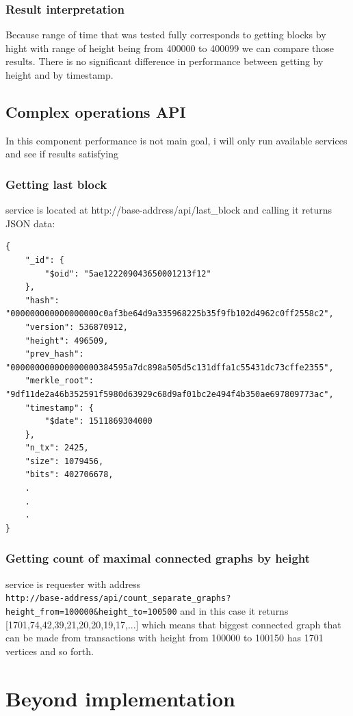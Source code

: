 \documentclass[12pt, en, eng, oneside]{mgr}
\begin{document}
\subsection{Result interpretation}
Because range of time that was tested fully corresponds to getting blocks by hight with range of height being from 400000 to 400099 we can compare those results. There is no significant difference in performance between getting by height and by timestamp.

\section{Complex operations API}
In this component performance is not main goal, i will only run available services and see if results satisfying

\subsection{Getting last block}
service is located at http://base-address/api/last\_block and calling it returns JSON data:
\begin{verbatim}
{
    "_id": {
        "$oid": "5ae122209043650001213f12"
    },
    "hash": "000000000000000000c0af3be64d9a335968225b35f9fb102d4962c0ff2558c2",
    "version": 536870912,
    "height": 496509,
    "prev_hash": "000000000000000000384595a7dc898a505d5c131dffa1c55431dc73cffe2355",
    "merkle_root": "9df11de2a46b352591f5980d63929c68d9af01bc2e494f4b350ae697809773ac",
    "timestamp": {
        "$date": 1511869304000
    },
    "n_tx": 2425,
    "size": 1079456,
    "bits": 402706678,
    .
    .
    .
}
\end{verbatim}

\subsection{Getting count of maximal connected graphs by height}
service is requester with address
\\ \verb|http://base-address/api/count_separate_graphs?height_from=100000&height_to=100500|
and in this case it returns [1701,74,42,39,21,20,20,19,17,...] which means that biggest connected graph that can be made from transactions with height from 100000 to 100150 has 1701 vertices and so forth.


\chapter{Beyond implementation}
\end{document}
